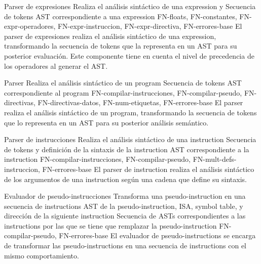 \begin{component}{Parser de expresiones}
    {Realiza el análisis sintáctico de una \gls{expression}} %
    { y } %
    {Secuencia de \glspl{token}} %
    {\gls{AST} correspondiente a una \gls{expression}} %
    {FN-floats, FN-constantes, FN-expr-operadores,
    FN-expr-instruccion, FN-expr-directiva, FN-errores-base} %
    El \gls{parser} de expresiones realiza el análisis sintáctico de una
    \gls{expression}, transformando la secuencia de \glspl{token} que la
    representa en un \gls{AST} para su posterior evaluación. Este componente
    tiene en cuenta el nivel de precedencia de los operadores al generar el
    \gls{AST}.
\end{component}

\begin{component}{Parser}
    {Realiza el análisis sintáctico de un \gls{program}} %
    {} %
    {Secuencia de \glspl{token}} %
    {\gls{AST} correspondiente al \gls{program}} %
    {FN-compilar-instrucciones, FN-compilar-pseudo, FN-directivas,
    FN-directivas-datos, FN-num-etiquetas, FN-errores-base} %
    El \gls{parser} realiza el análisis sintáctico de un \gls{program},
    transformando la secuencia de \glspl{token} que lo representa en un
    \gls{AST} para su posterior análisis semántico.
\end{component}

\begin{component}{Parser de instrucciones}
    {Realiza el análisis sintáctico de una \gls{instruction}} %
    {} %
    {Secuencia de \glspl{token} y definición de la sintaxis de la \gls{instruction}} %
    {\gls{AST} correspondiente a la \gls{instruction}} %
    {FN-compilar-instrucciones, FN-compilar-pseudo,
    FN-mult-defs-instruccion, FN-errores-base} %
    El \gls{parser} de \gls{instruction} realiza el análisis sintáctico de los
    argumentos de una \gls{instruction} según una cadena que define su sintaxis.
\end{component}

\begin{component}{Evaluador de pseudo-instrucciones}
    {Transforma una \gls{pseudo-instruction} en una secuencia de \glspl{instruction}} %
    {} %
    {\gls{AST} de la \gls{pseudo-instruction}, \gls{ISA}, \gls{symbol table}, y dirección de la siguiente \gls{instruction}} %
    {Secuencia de \glspl{AST} correspondientes a las \glspl{instruction} por las que se tiene que remplazar la \gls{pseudo-instruction}} %
    {FN-compilar-pseudo, FN-errores-base} %
    El evaluador de \glspl{pseudo-instruction} se encarga de transformar las
    \glspl{pseudo-instruction} en una secuencia de \glspl{instruction} con el
    mismo comportamiento.
\end{component}

